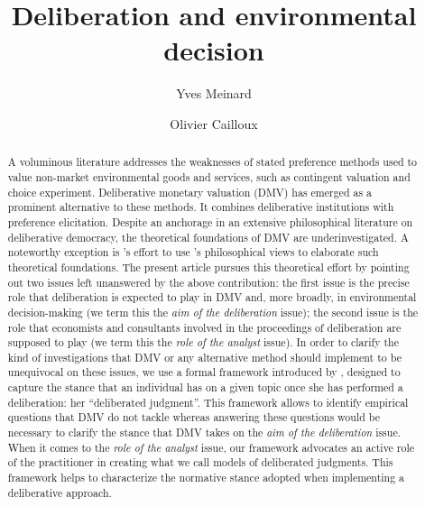 \documentclass[version=3.21, pagesize, twoside=off, bibliography=totoc, DIV=calc, fontsize=12pt, a4paper, french, english]{scrartcl}
\newcommand{\institute}[1]{}
\newcommand{\keywords}[1]{}
\begin{document}
\title{Deliberation and environmental decision}
\author{Yves Meinard \and Olivier Cailloux}
\institute{
	Yves Meinard
	\and
	Olivier Cailloux 
	\at 
	Université Paris-Dauphine, \\
	PSL Research University, \\
	CNRS, \\
	LAMSADE\\
	75016 PARIS, FRANCE\\
	\email{olivier.cailloux@dauphine.fr}
}
\makeatletter
\makeatother
\maketitle

\keywords{decision aid, justification, empirical validation, methodology}

\begin{abstract}
A voluminous literature addresses the weaknesses of stated preference methods used to value non-market environmental goods and services, such as contingent valuation and choice experiment. 
Deliberative monetary valuation (DMV) has emerged as a prominent alternative to these methods. It combines deliberative institutions with preference elicitation. 
Despite an anchorage in an extensive philosophical literature on deliberative democracy, the theoretical foundations of DMV are underinvestigated.  
A noteworthy exception is \citeauthor{bartkowski_beyond_2018}'s effort to use \citeauthor{sen_idea_2009}'s philosophical views to elaborate such theoretical foundations. 
The present article pursues this theoretical effort by pointing out two issues left unanswered by the above contribution: 
the first issue is the precise role that deliberation is expected to play in DMV and, more broadly, in environmental decision-making (we term this the \emph{aim of the deliberation} issue); 
the second issue is the role that economists and consultants involved in the proceedings of deliberation are supposed to play (we term this the \emph{role of the analyst} issue). 
In order to clarify the kind of investigations that DMV or any alternative method should implement to be unequivocal on these issues, we use a formal framework introduced by \citeauthor{cailloux_formal_2018}, designed to capture the stance that an individual has on a given topic once she has performed a deliberation: her ``deliberated judgment''. 
This framework allows to identify empirical questions that DMV do not tackle whereas answering these questions would be necessary to clarify the stance that DMV takes on the \emph{aim of the deliberation} issue. 
When it comes to the \emph{role of the analyst} issue, our framework advocates an active role of the practitioner in creating what we call models of deliberated judgments. 
This framework helps to characterize the normative stance adopted when implementing a deliberative approach.
\end{abstract}
\end{document}

